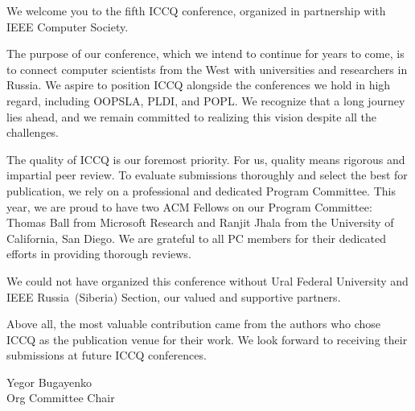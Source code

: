 
\cleardoublepage
{}

We welcome you to the fifth ICCQ conference, organized in partnership with IEEE Computer Society.

The purpose of our conference, which we intend to continue for years to come, is to connect computer scientists from the West with universities and researchers in Russia.
We aspire to position ICCQ alongside the conferences we hold in high regard, including OOPSLA, PLDI, and POPL.
We recognize that a long journey lies ahead, and we remain committed to realizing this vision despite all the challenges.

The quality of ICCQ is our foremost priority.
For us, quality means rigorous and impartial peer review.
To evaluate submissions thoroughly and select the best for publication, we rely on a professional and dedicated Program Committee.
This year, we are proud to have two ACM Fellows on our Program Committee:
  Thomas Ball from Microsoft Research
  and
  Ranjit Jhala from the University of California, San Diego.
We are grateful to all PC members for their dedicated efforts in providing thorough reviews.

We could not have organized this conference without Ural Federal University and IEEE Russia~(Siberia) Section, our valued and supportive partners.

Above all, the most valuable contribution came from the authors who chose ICCQ as the publication venue for their work.
We look forward to receiving their submissions at future ICCQ conferences.

\vspace{18pt}
Yegor Bugayenko\\
Org Committee Chair
